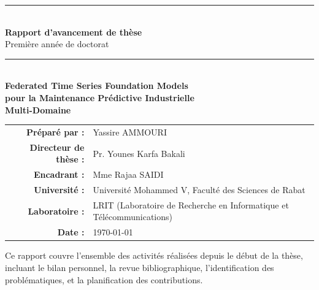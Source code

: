 \documentclass[12pt, a4paper]{report}
\begin{document}
\begin{titlepage}
  \centering
  \vspace*{1.5cm}
  {\color{mainblue}\rule{\linewidth}{2pt}}\\[0.4cm]
  {\huge\bfseries\color{mainblue} Rapport d'avancement de thèse}\\[0.3cm]
  {\large\color{darkgray} Première année de doctorat}\\[0.2cm]
  {\color{mainblue}\rule{\linewidth}{2pt}}\\[1.2cm]

  {\LARGE\bfseries Federated Time Series Foundation Models\\[0.3cm]
  pour la Maintenance Prédictive Industrielle\\[0.3cm]
  Multi-Domaine}\\[2cm]

  \begin{tabular}{rl}
    \textbf{Préparé par :} & Yassire AMMOURI\\[4pt]
    \textbf{Directeur de thèse :} & Pr. Younes Karfa Bakali\\[4pt]
    \textbf{Encadrant :} & Mme Rajaa SAIDI\\[4pt]
    \textbf{Université :} & Université Mohammed V, Faculté des Sciences de Rabat\\[4pt]
    \textbf{Laboratoire :} & LRIT (Laboratoire de Recherche en Informatique et Télécommunications)\\[4pt]
    \textbf{Date :}        & \today \\[4pt]
  \end{tabular}

  \vfill
  {\color{darkgray}\small Ce rapport couvre l'ensemble des activités réalisées depuis le
  début de la thèse, incluant le bilan personnel, la revue bibliographique,
  l'identification des problématiques, et la planification des contributions.}
\end{titlepage}

\tableofcontents
\clearpage

\end{document}
